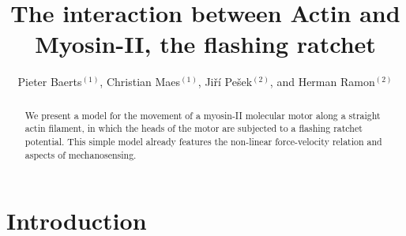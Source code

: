 \documentclass[aps,pre,onecolumn,showpacs,showkeys,a4paper]{revtex4}
\begin{document}
 

\title{The interaction between Actin and Myosin-II, the flashing ratchet}
\author{Pieter Baerts$^{(1)}$, Christian Maes$^{(1)}$, Ji\v{r}\'{i} Pe\v{s}ek$^{(2)}$, and Herman Ramon$^{(2)}$}
\begin{abstract}
We present a model for the movement of a myosin-II molecular motor along a straight actin filament, in which the heads of the motor are subjected to a flashing ratchet potential. This simple model already features the non-linear force-velocity relation and aspects of mechanosensing. 
\end{abstract}

\maketitle 

\section{Introduction}
\end{document}
